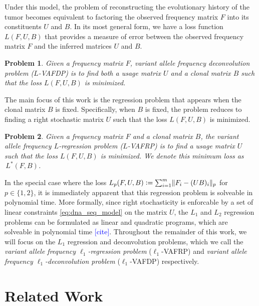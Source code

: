\documentclass[10pt]{article}
\newtheorem{problem}{Problem}
\newcommand{\henri}[1]{\textcolor{blue}{[#1]}}
\newcommand{\defeq}{\vcentcolon=}
\begin{document}
Under this model, the problem of reconstructing the evolutionary history of the tumor
becomes equivalent to factoring the observed frequency matrix $F$ into its constituents $U$ and $B$.
In its most general form, we have a loss function $L(F, U, B)$ that provides a measure of error 
between the observed frequency matrix $F$ and the inferred matrices $U$ and $B$.

\begin{problem}
  \label{prob:vafp}
  Given a frequency matrix $F$, \emph{variant allele frequency deconvolution problem} ($L$-VAFDP) is to
  find both a usage matrix $U$ and a clonal matrix $B$ such that the loss $L(F, U, B)$ is minimized.

\end{problem}

The main focus of this work is the regression problem that appears when the
clonal matrix $B$ is fixed. Specifically, when $B$ is fixed, the problem reduces to finding a 
right stochastic matrix $U$ such that the loss $L(F, U, B)$ is minimized. 

\begin{problem}
  \label{prob:vafpp}
  Given a frequency matrix $F$ and a clonal matrix $B$, the 
  \emph{variant allele frequency $L$-regression problem} ($L$-VAFRP) is to
  find a usage matrix $U$ such that the loss $L(F, U, B)$ is minimized.
  We denote this minimum loss as $\,L^*(F, B)$.
\end{problem}

In the special case where the loss $L_p(F, U, B) \defeq \sum_{i=1}^m\lVert F_i - (UB)_i \rVert_p$ for $p \in \{1, 2\}$,
it is immediately apparent that this regression problem is solveable in polynomial time. 
More formally, since right stochasticity is enforcable by a set of linear constraints \eqref{eq:dna_seq_model} on the matrix $U$,
the $L_1$ and $L_2$ regression problems can be formulated as linear and quadratic programs, 
which are solveable in polynomial time \henri{cite}. Throughout the remainder of this work,
we will focus on the $L_1$ regression and deconvolution problems, which we call the 
\emph{variant allele frequency $\ell_1$-regression problem} ($\ell_1$-VAFRP) and 
\emph{variant allele frequency $\ell_1$-deconvolution problem} ($\ell_1$-VAFDP)
respectively. 
\section{Related Work}
\end{document}
